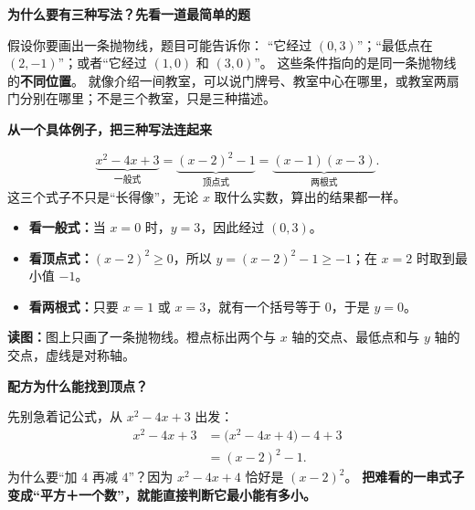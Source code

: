 \clearpage
\begin{explanationbox}
\textbf{\textcolor{CExplanation}{为什么要有三种写法？先看一道最简单的题}}


假设你要画出一条抛物线，题目可能告诉你：
“它经过 $(0,3)$”；“最低点在 $(2,-1)$”；或者“它经过 $(1,0)$ 和 $(3,0)$”。
这些条件指向的是同一条抛物线的\textbf{不同位置}。
就像介绍一间教室，可以说门牌号、教室中心在哪里，或教室两扇门分别在哪里；不是三个教室，只是三种描述。

\medskip

\end{explanationbox}
\clearpage
\begin{explanationbox}
\textbf{\textcolor{CExplanation}{从一个具体例子，把三种写法连起来}}


\[
\underbrace{x^2-4x+3}_{\text{一般式}}
=\underbrace{(x-2)^2-1}_{\text{顶点式}}
=\underbrace{(x-1)(x-3)}_{\text{两根式}}.
\]
这三个式子不只是“长得像”，无论 $x$ 取什么实数，算出的结果都一样。
\begin{itemize}[leftmargin=*,itemsep=0.35em,topsep=0.3em]
\item \textbf{看一般式：}当 $x=0$ 时，$y=3$，因此经过 $(0,3)$。
\item \textbf{看顶点式：}$(x-2)^2\ge0$，所以 $y=(x-2)^2-1\ge-1$；在 $x=2$ 时取到最小值 $-1$。
\item \textbf{看两根式：}只要 $x=1$ 或 $x=3$，就有一个括号等于 $0$，于是 $y=0$。
\end{itemize}


\noindent\small\textbf{读图：}图上只画了一条抛物线。橙点标出两个与 $x$ 轴的交点、最低点和与 $y$ 轴的交点，虚线是对称轴。\normalsize

\medskip

\end{explanationbox}
\clearpage
\begin{explanationbox}
\textbf{\textcolor{CExplanation}{配方为什么能找到顶点？}}


先别急着记公式，从 $x^2-4x+3$ 出发：
\[
\begin{aligned}
x^2-4x+3
&=\bigl(x^2-4x+4\bigr)-4+3\\
&=(x-2)^2-1.
\end{aligned}
\]
为什么要“加 $4$ 再减 $4$”？因为 $x^2-4x+4$ 恰好是 $(x-2)^2$。
\textbf{把难看的一串式子变成“平方＋一个数”，就能直接判断它最小能有多小。}

\medskip

\end{explanationbox}
